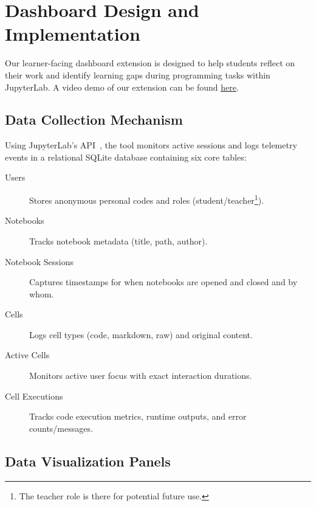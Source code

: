 \documentclass[acmsmall]{acmart}
\begin{document}
\section{Dashboard Design and Implementation}
Our learner-facing dashboard extension is designed to help students reflect on their work and identify learning gaps during programming tasks within JupyterLab. A video demo of our extension can be found \href{https://www.youtube.com/watch?v=VZKJdUi2B-k}{\color{blue}\underline{here}}.
\subsection{Data Collection Mechanism}

Using JupyterLab's API~\cite{jupyterlab_tutorial_2024, jupyterlab_extension_template}, the tool monitors active sessions and logs telemetry events in a relational SQLite database containing six core tables:
\begin{description}
    \item[Users] Stores anonymous personal codes and roles (student/teacher\footnote{The teacher role is there for potential future use.}). %
    
    \item[Notebooks] Tracks notebook metadata (title, path, author).
    
    \item[Notebook Sessions] Captures timestamps for when notebooks are opened and closed and by whom.
    
    \item[Cells] Logs cell types (code, markdown, raw) and original content.
    
    \item[Active Cells] Monitors active user focus with exact interaction durations.
    
    \item[Cell Executions] Tracks code execution metrics, runtime outputs, and error counts/messages.
\end{description}

\subsection{Data Visualization Panels}
\end{document}
